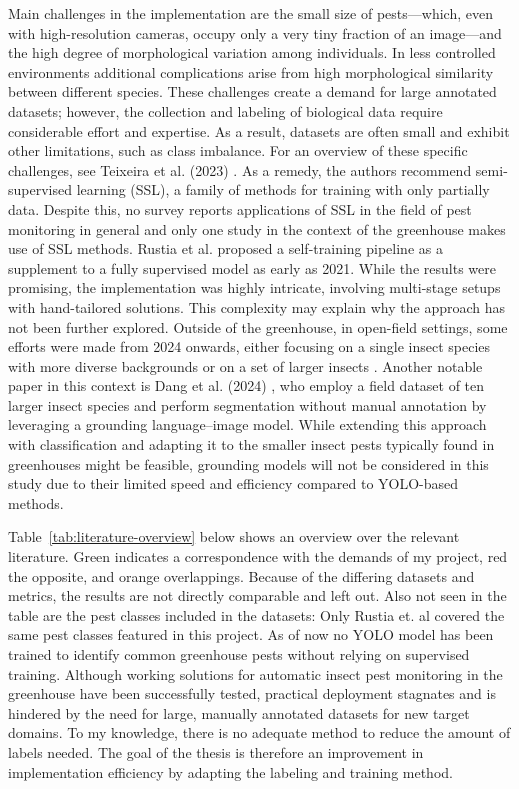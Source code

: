 \documentclass[12pt,a4paper]{article}
\begin{document}
Main challenges in the implementation are the small size of pests—which, even with high-resolution cameras, occupy only a very tiny fraction of an image—and the high degree of morphological variation among individuals. In less controlled environments additional complications arise from high morphological similarity between different species.
These challenges create a demand for large annotated datasets; however, the collection and labeling of biological data require considerable effort and expertise. As a result, datasets are often small and exhibit other limitations, such as class imbalance. For an overview of these specific challenges, see Teixeira et al. (2023) \cite{survey2023}. As a remedy, the authors recommend semi-supervised learning (SSL), a family of methods for training with only partially data. Despite this, no survey reports applications of SSL in the field of pest monitoring in general and only one study in the context of the greenhouse makes use of SSL methods. Rustia et al. \cite{rustia_online_2021} proposed a self-training pipeline as a supplement to a fully supervised model as early as 2021. While the results were promising, the implementation was highly intricate, involving multi-stage setups with hand-tailored solutions. This complexity may explain why the approach has not been further explored. Outside of the greenhouse, in open-field settings, some efforts were made from 2024 onwards, either focusing on a single insect species with more diverse backgrounds or on a set of larger insects \cite{li_mateacher_2024, majewski_improved_2024, zhou_mutual_2024, zhou_perceptive_2025, gomez-zamanillo_semi-supervised_2025}. Another notable paper in this context is Dang et al. (2024) \cite{dang_efficient_2024}, who employ a field dataset of ten larger insect species and perform segmentation without manual annotation by leveraging a grounding language–image model. While extending this approach with classification and adapting it to the smaller insect pests typically found in greenhouses might be feasible, grounding models will not be considered in this study due to their limited speed and efficiency compared to YOLO-based methods. 

Table~\ref{tab:literature-overview} below shows an overview over the relevant literature. Green indicates a correspondence with the demands of my project, red the opposite, and orange overlappings. Because of the differing datasets and metrics, the results are not directly comparable and left out. Also not seen in the table are the pest classes included in the datasets: Only Rustia et. al \cite{rustia_automatic_2021} covered the same pest classes featured in this project. As of now no YOLO model has been trained to identify common greenhouse pests without relying on supervised training. Although working solutions for automatic insect pest monitoring in the greenhouse have been successfully tested, practical deployment stagnates and is hindered by the need for large, manually annotated datasets for new target domains. To my knowledge, there is no adequate method to reduce the amount of labels needed. The goal of the thesis is therefore an improvement in implementation efficiency by adapting the labeling and training method.
\end{document}
